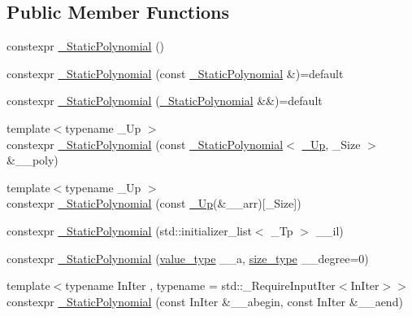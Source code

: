 \subsection*{Public Member Functions}
\begin{DoxyCompactItemize}
\item 
constexpr \hyperlink{class____gnu__cxx_1_1__StaticPolynomial_ab4cec2d98bc20429a2f464ec42a39b71}{\+\_\+\+Static\+Polynomial} ()
\item 
constexpr \hyperlink{class____gnu__cxx_1_1__StaticPolynomial_ab019a084751761a02aa75f34eb8a2a30}{\+\_\+\+Static\+Polynomial} (const \hyperlink{class____gnu__cxx_1_1__StaticPolynomial}{\+\_\+\+Static\+Polynomial} \&)=default
\item 
constexpr \hyperlink{class____gnu__cxx_1_1__StaticPolynomial_af7f38ef30d5ad83c60da2bc389cb7b29}{\+\_\+\+Static\+Polynomial} (\hyperlink{class____gnu__cxx_1_1__StaticPolynomial}{\+\_\+\+Static\+Polynomial} \&\&)=default
\item 
{\footnotesize template$<$typename \+\_\+\+Up $>$ }\\constexpr \hyperlink{class____gnu__cxx_1_1__StaticPolynomial_aaa12a167629e41db9d0964a39b657b6c}{\+\_\+\+Static\+Polynomial} (const \hyperlink{class____gnu__cxx_1_1__StaticPolynomial}{\+\_\+\+Static\+Polynomial}$<$ \hyperlink{namespace____gnu__cxx_ab693ea357b6429b331e0bf09f9442385}{\+\_\+\+Up}, \+\_\+\+Size $>$ \&\+\_\+\+\_\+poly)
\item 
{\footnotesize template$<$typename \+\_\+\+Up $>$ }\\constexpr \hyperlink{class____gnu__cxx_1_1__StaticPolynomial_ae7040aa4ca84a8af3d9c7ab15eb79ab3}{\+\_\+\+Static\+Polynomial} (const \hyperlink{namespace____gnu__cxx_ab693ea357b6429b331e0bf09f9442385}{\+\_\+\+Up}(\&\+\_\+\+\_\+arr)\mbox{[}\+\_\+\+Size\mbox{]})
\item 
constexpr \hyperlink{class____gnu__cxx_1_1__StaticPolynomial_ab713e4b435e6d0a3e080eeaf668dcda7}{\+\_\+\+Static\+Polynomial} (std\+::initializer\+\_\+list$<$ \+\_\+\+Tp $>$ \+\_\+\+\_\+il)
\item 
constexpr \hyperlink{class____gnu__cxx_1_1__StaticPolynomial_a40180f74c050c65c9a61f18f0ea1f417}{\+\_\+\+Static\+Polynomial} (\hyperlink{class____gnu__cxx_1_1__StaticPolynomial_aad5f3d6d5876b6926b30724aeac649d6}{value\+\_\+type} \+\_\+\+\_\+a, \hyperlink{class____gnu__cxx_1_1__StaticPolynomial_a0cc0aa4adab35686ef2474e07f511ff9}{size\+\_\+type} \+\_\+\+\_\+degree=0)
\item 
{\footnotesize template$<$typename In\+Iter , typename  = std\+::\+\_\+\+Require\+Input\+Iter$<$\+In\+Iter$>$$>$ }\\constexpr \hyperlink{class____gnu__cxx_1_1__StaticPolynomial_a584243df0cb49a1a9f114180bbb499e2}{\+\_\+\+Static\+Polynomial} (const In\+Iter \&\+\_\+\+\_\+abegin, const In\+Iter \&\+\_\+\+\_\+aend)

\end{DoxyCompactItemize}
